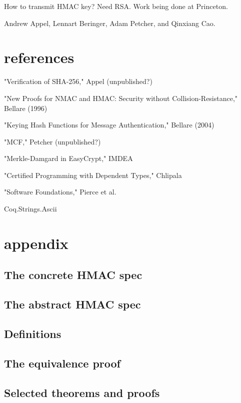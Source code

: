 \documentclass[twocolumn,showpacs,%
  nofootinbib,aps,superscriptaddress,%
  eqsecnum,prd,notitlepage,showkeys,10pt]{revtex4-1}
\begin{document}
How to transmit HMAC key? Need RSA. Work being done at Princeton.


\begin{acknowledgments}

Andrew Appel, Lennart Beringer, Adam Petcher, and Qinxiang Cao.

\end{acknowledgments}

\section{references}

"Verification of SHA-256," Appel (unpublished?)

"New Proofs for NMAC and HMAC: Security without Collision-Resistance," Bellare (1996)

"Keying Hash Functions for Message Authentication," Bellare (2004)

"MCF," Petcher (unpublished?)

"Merkle-Damgard in EasyCrypt," IMDEA

"Certified Programming with Dependent Types," Chlipala

"Software Foundations," Pierce et al.

Coq.Strings.Ascii

\section{appendix}

\subsection{The concrete HMAC spec}

\subsection{The abstract HMAC spec}

\subsection{Definitions}

\subsection{The equivalence proof}

\subsection{Selected theorems and proofs}
\end{document}
